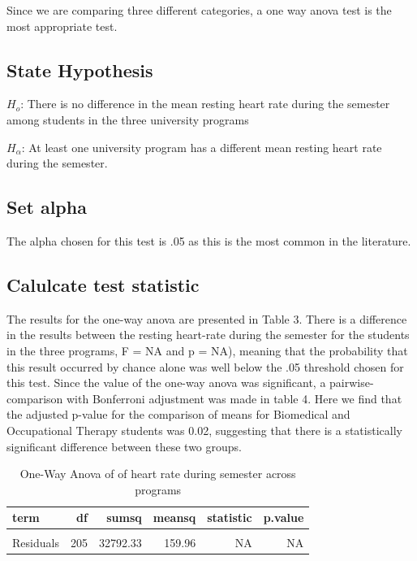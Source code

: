 \documentclass[preprint, 3p,
authoryear]{elsarticle} %
\begin{document}
Since we are comparing three different categories, a one way anova test
is the most appropriate test.

\hypertarget{state-hypothesis}{%
\subsection{State Hypothesis}\label{state-hypothesis}}

\(H_o\): There is no difference in the mean resting heart rate during
the semester among students in the three university programs

\(H_\alpha\): At least one university program has a different mean
resting heart rate during the semester.

\hypertarget{set-alpha}{%
\subsection{Set alpha}\label{set-alpha}}

The alpha chosen for this test is .05 as this is the most common in the
literature.

\hypertarget{calulcate-test-statistic}{%
\subsection{Calulcate test statistic}\label{calulcate-test-statistic}}

The results for the one-way anova are presented in Table 3. There is a
difference in the results between the resting heart-rate during the
semester for the students in the three programs, F = NA and p = NA),
meaning that the probability that this result occurred by chance alone
was well below the .05 threshold chosen for this test. Since the value
of the one-way anova was significant, a pairwise-comparison with
Bonferroni adjustment was made in table 4. Here we find that the
adjusted p-value for the comparison of means for Biomedical and
Occupational Therapy students was 0.02, suggesting that there is a
statistically significant difference between these two groups.

\begin{table}

\caption{\label{tab:unnamed-chunk-5}One-Way Anova of of heart rate during semester across programs}
\centering
\fontsize{7}{9}\selectfont
\begin{tabular}[t]{l|r|r|r|r|r}
\hline
\textbf{term} & \textbf{df} & \textbf{sumsq} & \textbf{meansq} & \textbf{statistic} & \textbf{p.value}\\
\hline
\cellcolor{gray!6}{Program} & \cellcolor{gray!6}{2} & \cellcolor{gray!6}{1289.86} & \cellcolor{gray!6}{644.93} & \cellcolor{gray!6}{4.03} & \cellcolor{gray!6}{0.02}\\
\hline
Residuals & 205 & 32792.33 & 159.96 & NA & NA\\
\hline
\end{tabular}
\end{table}
\end{document}
